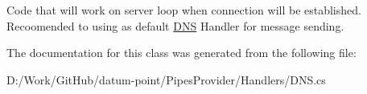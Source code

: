 Code that will work on server loop when connection will be established. Recoomended to using as default \mbox{\hyperlink{class_pipes_provider_1_1_handlers_1_1_d_n_s}{D\+NS}} Handler for message sending. 



The documentation for this class was generated from the following file\+:\begin{DoxyCompactItemize}
\item 
D\+:/\+Work/\+Git\+Hub/datum-\/point/\+Pipes\+Provider/\+Handlers/D\+N\+S.\+cs\end{DoxyCompactItemize}
